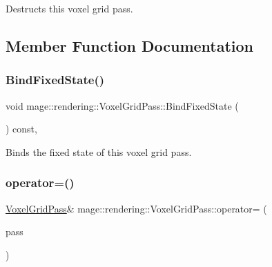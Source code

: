 Destructs this voxel grid pass. 

\subsection{Member Function Documentation}
\hypertarget{classmage_1_1rendering_1_1_voxel_grid_pass_a38a3d6338eded537aab2ced5c486bdd4}{}\label{classmage_1_1rendering_1_1_voxel_grid_pass_a38a3d6338eded537aab2ced5c486bdd4} 
\subsubsection{\texorpdfstring{Bind\+Fixed\+State()}{BindFixedState()}}
{\footnotesize\ttfamily void mage\+::rendering\+::\+Voxel\+Grid\+Pass\+::\+Bind\+Fixed\+State (\begin{DoxyParamCaption}{ }\end{DoxyParamCaption}) const\hspace{0.3cm}{\ttfamily [private]}, {\ttfamily [noexcept]}}

Binds the fixed state of this voxel grid pass. \hypertarget{classmage_1_1rendering_1_1_voxel_grid_pass_a6f696f05c430a0b84d8346099ec7d0aa}{}\label{classmage_1_1rendering_1_1_voxel_grid_pass_a6f696f05c430a0b84d8346099ec7d0aa} 
\subsubsection{\texorpdfstring{operator=()}{operator=()}\hspace{0.1cm}{\footnotesize\ttfamily [1/2]}}
{\footnotesize\ttfamily \hyperlink{classmage_1_1rendering_1_1_voxel_grid_pass}{Voxel\+Grid\+Pass}\& mage\+::rendering\+::\+Voxel\+Grid\+Pass\+::operator= (\begin{DoxyParamCaption}\item[{const \hyperlink{classmage_1_1rendering_1_1_voxel_grid_pass}{Voxel\+Grid\+Pass} \&}]{pass }\end{DoxyParamCaption})\hspace{0.3cm}{\ttfamily [delete]}}

